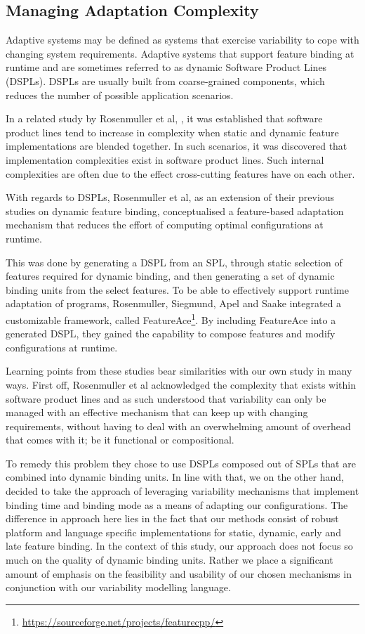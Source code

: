\documentclass[conference]{IEEEtran}
\newcommand{\foot}[1]{\footnote{\url{#1}}}
\begin{document}
\subsection{Managing Adaptation Complexity}
Adaptive systems may be defined as systems that exercise variability to cope with changing system requirements. Adaptive systems that support feature binding at runtime and are sometimes referred to as dynamic Software Product Lines (DSPLs). DSPLs are usually built from coarse-grained components, which reduces the number of possible application scenarios.

In a related study by Rosenmuller et al, \cite{fmod-lang-scenarios}, it was established that software product lines tend to increase in complexity when static and dynamic feature implementations are blended together. In such scenarios, it was discovered that implementation complexities exist in software product lines. Such internal complexities are often due to the effect cross-cutting features have on each other.

With regards to DSPLs, Rosenmuller et al, as an extension of their previous studies on dynamic feature binding, \cite{tailor-spl} conceptualised a feature-based adaptation mechanism that reduces the effort of computing optimal configurations at runtime.

This was done by generating a DSPL from an SPL, through static selection of features required for dynamic binding, and then generating a set of dynamic binding units from the select features. To be able to effectively support runtime adaptation of programs, Rosenmuller, Siegmund, Apel and Saake integrated a customizable framework, called FeatureAce\foot{https://sourceforge.net/projects/featurecpp/}. By including FeatureAce into a generated DSPL, they gained the capability to compose features and modify configurations at runtime.

Learning points from these studies bear similarities with our own study in many ways. First off, Rosenmuller et al\cite{tailor-spl} acknowledged the complexity that exists within software product lines and as such understood that variability can only be managed with an effective mechanism that can keep up with changing requirements, without having to deal with an overwhelming amount of overhead that comes with it; be it functional or compositional.

To remedy this problem they chose to use DSPLs composed out of SPLs that are combined into dynamic binding units. In line with that, we on the other hand, decided to take the approach of leveraging variability mechanisms that implement binding time and binding mode as a means of adapting our configurations. The difference in approach here lies in the fact that our methods consist of robust platform and language specific implementations for static, dynamic, early and late feature binding. In the context of this study, our approach does not focus so much on the quality of dynamic binding units. Rather we place a significant amount of emphasis on the feasibility and usability of our chosen mechanisms in conjunction with our variability modelling language.
 
\end{document}
